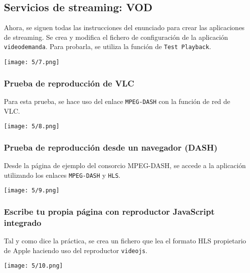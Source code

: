 \subsection{Servicios de streaming: VOD}
Ahora, se siguen todas las instrucciones del enunciado para crear las aplicaciones
de streaming. Se crea y modifica el fichero de configuración de la aplicación
\Verb#videodemanda#. Para probarla, se utiliza la función de \Verb#Test Playback#.

\begin{minipage}{\linewidth}
	\centering
	\texttt{[image: 5/7.png]}
	\label{fig:5/7}
\end{minipage}

\subsubsection{Prueba de reproducción de VLC}
Para esta prueba, se hace uso del enlace \Verb#MPEG-DASH# con la función de red de VLC{.}

\begin{minipage}{\linewidth}
	\centering
	\texttt{[image: 5/8.png]}
	\label{fig:5/8}
\end{minipage}

\subsubsection{Prueba de reproducción desde un navegador (DASH)}
Desde la página de ejemplo del consorcio MPEG-DASH, se accede a la aplicación
utilizando los enlaces \Verb#MPEG-DASH# y \Verb#HLS#.

\begin{minipage}{\linewidth}
	\centering
	\texttt{[image: 5/9.png]}
	\label{fig:5/9}
\end{minipage}

\subsubsection{Escribe tu propia página con reproductor JavaScript integrado}\label{sec:5/HLS}
Tal y como dice la práctica, se crea un fichero que lea el formato HLS propietario de Apple
haciendo uso del reproductor \Verb#videojs#.

\begin{minipage}{\linewidth}
	\centering
	\texttt{[image: 5/10.png]}
	\label{fig:5/10}
\end{minipage}

